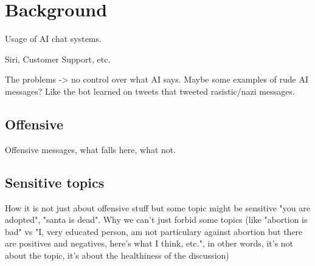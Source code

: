 \chapter{Background}
\label{chap:background}

Usage of AI chat systems.

Siri, Customer Support, etc.

The problems -> no control over what AI says. Maybe some examples of rude AI messages? Like the bot
learned on tweets that tweeted rasistic/nazi messages.

\section{Offensive}

Offensive messages, what falls here, what not.

\section{Sensitive topics}

How it is not just about offensive stuff but some topic might be sensitive "you are adopted", "santa is dead".
Why we can't just forbid some topics (like "abortion is bad" vs "I, very educated person, am not particulary against
abortion but there are positives and negatives, here's what I think, etc.", in other words, it's not about the topic,
it's about the healthiness of the discussion)

\cdots
